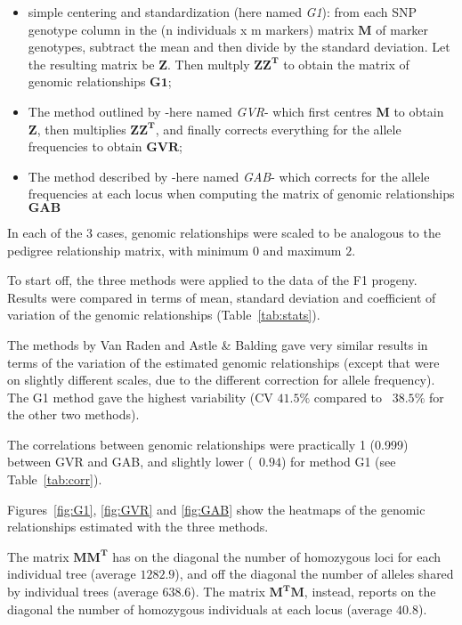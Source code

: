\documentclass[english,11pt,a4paper]{scrartcl}
\begin{document}
\begin{itemize}
\item simple centering and standardization (here named \emph{G1}): from each SNP genotype column
  in the (n individuals x m markers) matrix $\boldsymbol{M}$ of marker
  genotypes, subtract the mean and then divide by the standard
  deviation. Let the resulting matrix be $\boldsymbol{Z}$. Then multply
  $\boldsymbol{ZZ^T}$ to obtain the matrix of genomic relationships $\boldsymbol{G1}$; 
\item The method outlined by \cite{vanraden2008efficient} -here named
  \emph{GVR}- which first centres $\boldsymbol{M}$ to obtain $\boldsymbol{Z}$, then multiplies
  $\boldsymbol{ZZ^T}$, and finally corrects everything for the allele
  frequencies to obtain $\boldsymbol{GVR}$;
\item The method described by \cite{astle2009population} -here named
  \emph{GAB}- which corrects
  for the allele frequencies at each locus when computing the matrix of
  genomic relationships  $\boldsymbol{GAB}$  
\end{itemize}

In each of the 3 cases, genomic relationships were scaled to be analogous to the
pedigree relationship matrix, with minimum $0$ and maximum $2$.

To start off, the three methods were applied to the data of the
F1 progeny. Results were compared in terms of mean, standard
deviation and coefficient of variation of the genomic relationships
(Table~\ref{tab:stats}).

The methods by Van Raden and Astle \& Balding gave very similar results
in terms of the variation of the estimated genomic relationships (except
that were on slightly different scales, due to the different correction
for allele frequency). The G1 method gave the highest variability (CV
$41.5\%$ compared to ~$38.5\%$ for the other two methods).



The correlations between genomic relationships were practically 1
(0.999) between GVR and GAB, and slightly lower (~$0.94$) for method G1
(see Table~\ref{tab:corr}). 



Figures~\ref{fig:G1}, \ref{fig:GVR} and \ref{fig:GAB} show the heatmaps
of the genomic relationships estimated with the three methods.

The matrix $\boldsymbol{MM^T}$ has on the diagonal the number of
homozygous loci for each individual tree (average $1282.9$), and off
the diagonal the number of alleles shared by individual trees (average
$638.6$). The matrix $\boldsymbol{M^TM}$, instead, reports on the
diagonal the number of homozygous individuals at each locus (average
$40.8$).
\end{document}
